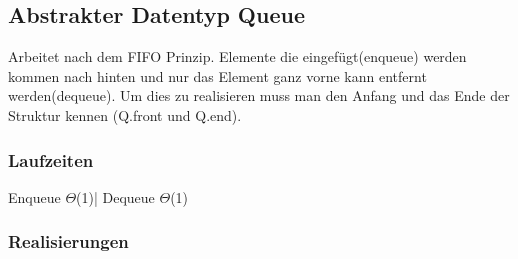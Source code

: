 \documentclass[jou,apacite]{apa6}
\begin{document}
\subsection{Abstrakter Datentyp Queue}
Arbeitet nach dem FIFO Prinzip. Elemente die eingefügt(enqueue) werden kommen nach hinten und nur das Element ganz vorne kann entfernt werden(dequeue). Um dies zu realisieren muss man den Anfang und das Ende der Struktur kennen (Q.front und Q.end). \\
\subsubsection{Laufzeiten}
Enqueue    $\Theta$(1)| Dequeue $\Theta$(1) \\
\subsubsection{Realisierungen}
\end{document}
